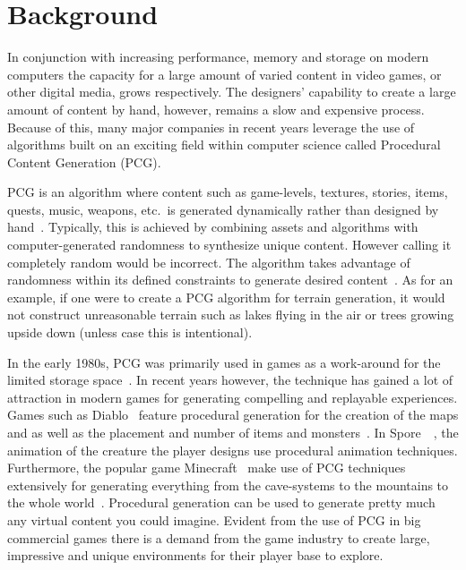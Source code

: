 \section{Background}

In conjunction with increasing performance, memory and storage on modern computers the capacity for a large amount of varied content in video games, or other digital media, grows respectively.
The designers' capability to create a large amount of content by hand, however, remains a slow and expensive process.
Because of this, many major companies in recent years leverage the use of algorithms built on an exciting field within computer science called Procedural Content Generation (PCG).

PCG is an algorithm where content such as game-levels, textures, stories, items, quests, music, weapons, etc.\ is generated dynamically rather than designed by hand~\cite[p.1]{PCG_in_games}.
Typically, this is achieved by combining assets and algorithms with computer-generated randomness to synthesize unique content. However calling it completely random would be incorrect.
The algorithm takes advantage of randomness within its defined constraints to generate desired content~\cite{Gamasutra}.
As for an example, if one were to create a PCG algorithm for terrain generation, it would not construct unreasonable terrain such as lakes flying in the air or trees growing upside down (unless case this is intentional). 
	
In the early 1980s, PCG was primarily used in games as a work-around for the limited storage space~\cite[p.4]{PCG_in_games}.
In recent years however, the technique has gained a lot of attraction in modern games for generating compelling and replayable experiences.
Games such as Diablo~\cite{diablo} feature procedural generation for the creation of the maps and as well as the placement and number of items and monsters~\cite[p.4]{PCG_in_games}.
In Spore~\cite{spore}~, the animation of the creature the player designs use procedural animation techniques\cite[p.4]{PCG_in_games}.
Furthermore, the popular game Minecraft~\cite{minecraft} make use of PCG techniques extensively for generating everything from the cave-systems to the mountains to the whole world~\cite[p.4]{PCG_in_games}.
Procedural generation can be used to generate pretty much any virtual content you could imagine.
Evident from the use of PCG in big commercial games there is a demand from the game industry to create large, impressive and unique environments for their player base to explore.

